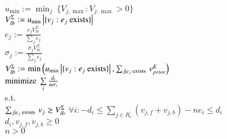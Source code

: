 \begin{AlgFloat}[H]
\begin{Algorithm}[FALCON]
\label{alg:FALCON}
\begin{algorithmic}
~\\
$u_{\min} := \min_j\ \{V_{j,\max} : V_{j,\max} > 0\}$\\
$V_{lb}^{\Sigma} := u_{\min} \left|\{v_j : e_j \textnormal{ exists}\}\right|$\\
  \STATE $e_j := \frac{e_j V_{lb}^{\Sigma}}
    {\sum\limits_{j} e_j}$\\ 
  \STATE $\sigma_j := \frac{\sigma_j V_{lb}^{\Sigma}}
    {\sum\limits_{j} e_j}$\\ 
\ENDFOR
{}
  \STATE $V_{lb}^{\Sigma} := \min\left(u_{\min} \left|\{v_j : 
    e_j \textnormal{ exists}\}\right|, 
    \sum_{j \mid e_j \textnormal{ exists }} v_{prior}^{E}\right)$\\
  \INDSTATE $\textnormal{minimize}\ \sum\limits_i \frac{d_i}{n
    \sigma_i}$ \\
  \INDSTATE s.t. \\
  \INDSTATE $\sum_{j \mid e_j \textnormal{ exists }} v_j \geq V_{lb}^{\Sigma}$ 
  \INDSTATE $\forall i: -d_i \leq \sum\nolimits_{j \in R_i} (v_{j,f} +
    v_{j,b}) - n e_i \leq d_i$ \\
  \INDSTATE $d_i, v_{j,f}, v_{j,b} \geq 0$ \\
  \INDSTATE $n > 0$
  \ENDFOR
\ENDWHILE
\end{algorithmic}
\end{Algorithm}
\end{AlgFloat}


